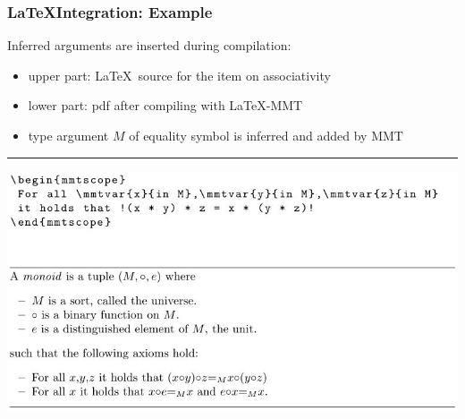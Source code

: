 \documentclass{beamer}
\begin{document}
\begin{frame}\frametitle{\LaTeX Integration: Example}
Inferred arguments are inserted during compilation:
\begin{itemize}
\item upper part: \LaTeX\ source for the item on associativity
\item lower part: pdf after compiling with \LaTeX-MMT
\item type argument $M$ of equality symbol is inferred and added by MMT
\end{itemize}
\medskip

\hrule\medskip

\includegraphics[width=\textwidth]{img/latex-mmt.jpg}
\thispagestyle{empty}
\end{frame}

\end{document}
